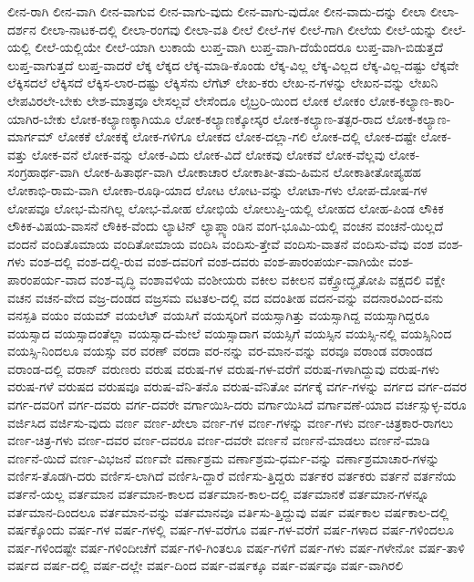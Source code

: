 {ಲೀನ-ರಾಗಿ
ಲೀನ-ವಾಗಿ
ಲೀನ-ವಾಗುವ
ಲೀನ-ವಾಗು-ವುದು
ಲೀನ-ವಾಗು-ವುದೋ
ಲೀನ-ವಾದು-ದನ್ನು
ಲೀಲಾ
ಲೀಲಾ-ದರ್ಶನ
ಲೀಲಾ-ನಾಟಕ-ದಲ್ಲಿ
ಲೀಲಾ-ರಂಗವು
ಲೀಲಾ-ವತಿ
ಲೀಲೆ
ಲೀಲೆ-ಗಳ
ಲೀಲೆ-ಗಾಗಿ
ಲೀಲೆಯ
ಲೀಲೆ-ಯನ್ನು
ಲೀಲೆ-ಯಲ್ಲಿ
ಲೀಲೆ-ಯಲ್ಲಿಯೇ
ಲೀಲೆ-ಯಾಗಿ
ಲುಕಾಯೆ
ಲುಪ್ತ-ವಾಗಿ
ಲುಪ್ತ-ವಾಗಿ-ದೆಯೆಂದರೂ
ಲುಪ್ತ-ವಾಗಿ-ಬಿಡುತ್ತದೆ
ಲುಪ್ತ-ವಾಗುತ್ತದೆ
ಲುಪ್ತ-ವಾದರೆ
ಲೆಕ್ಕ
ಲೆಕ್ಕದ
ಲೆಕ್ಕ-ಮಾಡಿ-ಕೊಂಡು
ಲೆಕ್ಕ-ವಿಲ್ಲ
ಲೆಕ್ಕ-ವಿಲ್ಲದ
ಲೆಕ್ಕ-ವಿಲ್ಲ-ದಷ್ಟು
ಲೆಕ್ಕವೇ
ಲೆಕ್ಕಿಸದಲೆ
ಲೆಕ್ಕಿಸದೆ
ಲೆಕ್ಕಿಸ-ಲಾರ-ದಷ್ಟು
ಲೆಕ್ಕಿಸೆನು
ಲೆಗೆಟ್
ಲೇಖ-ಕರು
ಲೇಖ-ನ-ಗಳನ್ನು
ಲೇಖನ-ವನ್ನು
ಲೇಖನಿ
ಲೇಪವಿರಲೇ-ಬೇಕು
ಲೇಶ-ಮಾತ್ರವೂ
ಲೇಸಲ್ಲವೆ
ಲೇಸೆಂದೂ
ಲೈಬ್ರರಿ-ಯಿಂದ
ಲೋಕ
ಲೋಕಂ
ಲೋಕ-ಕಲ್ಯಾಣ-ಕಾರಿ-ಯಾಗಿರ-ಬೇಕು
ಲೋಕ-ಕಲ್ಯಾಣಕ್ಕಾಗಿಯೂ
ಲೋಕ-ಕಲ್ಯಾಣಕ್ಕೋಸ್ಕರ
ಲೋಕ-ಕಲ್ಯಾಣ-ತತ್ಪರ-ರಾದ
ಲೋಕ-ಕಲ್ಯಾಣ-ಮಾರ್ಗಮ್
ಲೋಕಕೆ
ಲೋಕಕ್ಕೆ
ಲೋಕ-ಗಳಿಗೂ
ಲೋಕದ
ಲೋಕ-ದಲ್ಲಾ-ಗಲಿ
ಲೋಕ-ದಲ್ಲಿ
ಲೋಕ-ದಷ್ಟೇ
ಲೋಕ-ವತ್ತು
ಲೋಕ-ವನೆ
ಲೋಕ-ವನ್ನು
ಲೋಕ-ವಿದು
ಲೋಕ-ವಿದೆ
ಲೋಕವು
ಲೋಕವೆ
ಲೋಕ-ವೆಲ್ಲವು
ಲೋಕ-ಸಂಗ್ರಹಾರ್ಥ-ವಾಗಿ
ಲೋಕ-ಹಿತಾರ್ಥ-ವಾಗಿ
ಲೋಕಾಚಾರ
ಲೋಕಾತೀ-ತಮ-ಹಿಮನ
ಲೋಕಾತೀತೋಪ್ಯಹಹ
ಲೋಕಾಭಿ-ರಾಮ-ವಾಗಿ
ಲೋಕಾ-ರೂಢಿ-ಯಾದ
ಲೋಟ
ಲೋಟ-ವನ್ನು
ಲೋಟಾ-ಗಳು
ಲೋಪ-ದೋಷ-ಗಳ
ಲೋಪವೂ
ಲೋಭ-ಮೆನಗಿಲ್ಲ
ಲೋಭ-ಮೋಹ
ಲೋಭಿಯೆ
ಲೋಲುಪ್ತಿ-ಯಲ್ಲಿ
ಲೋಹದ
ಲೋಹ-ಪಿಂಡ
ಲೌಕಿಕ
ಲೌಕಿಕ-ವಿಷಯ-ವಾಸನೆ
ಲೌಕಿಕ-ವೆಂದು
ಲ್ಯಾಟಿನ್
ಲ್ಯಾಪ್ಲ್ಯಾಂಡಿನ
ವಂಗ-ಭೂಮಿ-ಯಲ್ಲಿ
ವಂಚನ
ವಂಚನೆ-ಯಿಲ್ಲದೆ
ವಂದನೆ
ವಂದಿತೊಮಾಯ
ವಂದಿತೋಮಾಯ
ವಂದಿಸಿ
ವಂದಿಸು-ತ್ತೇವೆ
ವಂದಿಸು-ವಾತನೆ
ವಂದಿಸು-ವೆವು
ವಂಶ
ವಂಶ-ಗಳು
ವಂಶ-ದಲ್ಲಿ
ವಂಶ-ದಲ್ಲಿ-ರುವ
ವಂಶ-ದವರಿಗೆ
ವಂಶ-ದವರು
ವಂಶ-ಪಾರಂಪರ್ಯ-ವಾಗಿಯೇ
ವಂಶ-ಪಾರಂಪರ್ಯ-ವಾದ
ವಂಶ-ವೃದ್ಧಿ
ವಂಶಾವಳಿಯ
ವಂಶೀಯರು
ವಕೀಲ
ವಕೀಲನ
ವಕ್ತ್ರೋದ್ಧೃತೋಪಿ
ವಕ್ಷದಲಿ
ವಕ್ಷೇ
ವಚನ
ವಚನ-ವೇದ
ವಜ್ರ-ದಂಡದ
ವಜ್ರಸಮ
ವಟತಲ-ದಲ್ಲಿ
ವದ
ವದಂತೀಹ
ವದನ-ವನ್ನು
ವದನಾರವಿಂದ-ವನು
ವನಸ್ಪತಿ
ವಯಂ
ವಯಮ್
ವಯಲೆಟ್
ವಯಸಿಗೆ
ವಯಸ್ಕರಿಗೆ
ವಯಸ್ಸಾಗಿತ್ತು
ವಯಸ್ಸಾಗಿದ್ದ
ವಯಸ್ಸಾಗಿದ್ದರೂ
ವಯಸ್ಸಾದ
ವಯಸ್ಸಾದಂತೆಲ್ಲಾ
ವಯಸ್ಸಾದ-ಮೇಲೆ
ವಯಸ್ಸಾದಾಗ
ವಯಸ್ಸಿಗೆ
ವಯಸ್ಸಿನ
ವಯಸ್ಸಿ-ನಲ್ಲಿ
ವಯಸ್ಸಿನಿಂದ
ವಯಸ್ಸಿ-ನಿಂದಲೂ
ವಯಸ್ಸು
ವರ
ವರಣ್
ವರದಾ
ವರ-ನನ್ನು
ವರ-ಮಾನ-ವನ್ನು
ವರವೂ
ವರಾಂಡ
ವರಾಂಡದ
ವರಾಂಡ-ದಲ್ಲಿ
ವರಾನ್
ವರುಣರು
ವರುಷ
ವರುಷ-ಗಳ
ವರುಷ-ಗಳ-ವರೆಗೆ
ವರುಷ-ಗಳಾಗಿದ್ದುವು
ವರುಷ-ಗಳು
ವರುಷ-ಗಳೆ
ವರುಷದ
ವರುಷವೂ
ವರುಷ-ವೆನಿ-ತನೊ
ವರುಷ-ವೆನಿತೋ
ವರ್ಗಕ್ಕೆ
ವರ್ಗ-ಗಳನ್ನು
ವರ್ಗದ
ವರ್ಗ-ದವರ
ವರ್ಗ-ದವರಿಗೆ
ವರ್ಗ-ದವರು
ವರ್ಗ-ದವರೇ
ವರ್ಗಾಯಿಸಿ-ದರು
ವರ್ಗಾಯಿಸಿದೆ
ವರ್ಗಾವಣೆ-ಯಾದ
ವರ್ಚಸ್ಸುಳ್ಳ-ವರೂ
ವರ್ಜಿಸಿದ
ವರ್ಜಿಸು-ವುದು
ವರ್ಣ
ವರ್ಣ-ಖೇಲಾ
ವರ್ಣ-ಗಳ
ವರ್ಣ-ಗಳನ್ನು
ವರ್ಣ-ಗಳು
ವರ್ಣ-ಚಿತ್ರಕಾರ-ರಾಗಲು
ವರ್ಣ-ಚಿತ್ರ-ಗಳು
ವರ್ಣ-ದವರ
ವರ್ಣ-ದವರೂ
ವರ್ಣ-ದವರೇ
ವರ್ಣನೆ
ವರ್ಣನೆ-ಮಾಡಲು
ವರ್ಣನೆ-ಮಾಡಿ
ವರ್ಣನೆ-ಯಿದೆ
ವರ್ಣ-ವಿಭಜನೆ
ವರ್ಣವೇ
ವರ್ಣಾಶ್ರಮ
ವರ್ಣಾಶ್ರಮ-ಧರ್ಮ-ವನ್ನು
ವರ್ಣಾಶ್ರಮಾಚಾರ-ಗಳನ್ನು
ವರ್ಣಿಸ-ತೊಡಗಿ-ದರು
ವರ್ಣಿಸ-ಲಾಗಿದೆ
ವರ್ಣಿಸಿ-ದ್ದಾರೆ
ವರ್ಣಿಸು-ತ್ತಿದ್ದರು
ವರ್ತಕರ
ವರ್ತಕರು
ವರ್ತನೆ
ವರ್ತನೆಯ
ವರ್ತನೆ-ಯಲ್ಲ
ವರ್ತಮಾನ
ವರ್ತಮಾನ-ಕಾಲದ
ವರ್ತಮಾನ-ಕಾಲ-ದಲ್ಲಿ
ವರ್ತಮಾನಕೆ
ವರ್ತಮಾನ-ಗಳನ್ನೂ
ವರ್ತಮಾನ-ದಿಂದಲೂ
ವರ್ತಮಾನ-ವನ್ನು
ವರ್ತಮಾನವೂ
ವರ್ತಿಸು-ತ್ತಿದ್ದುವು
ವರ್ಷ
ವರ್ಷಕಾಲ
ವರ್ಷಕಾಲ-ದಲ್ಲಿ
ವರ್ಷಕ್ಕೊಂದು
ವರ್ಷ-ಗಳ
ವರ್ಷ-ಗಳಲ್ಲಿ
ವರ್ಷ-ಗಳ-ವರೆಗೂ
ವರ್ಷ-ಗಳ-ವರೆಗೆ
ವರ್ಷ-ಗಳಾದ
ವರ್ಷ-ಗಳಿಂದಲೂ
ವರ್ಷ-ಗಳಿಂದಷ್ಟೇ
ವರ್ಷ-ಗಳಿಂದೀಚೆಗೆ
ವರ್ಷ-ಗಳಿ-ಗಿಂತಲೂ
ವರ್ಷ-ಗಳಿಗೆ
ವರ್ಷ-ಗಳು
ವರ್ಷ-ಗಳೇನೋ
ವರ್ಷ-ತಾಳಿ
ವರ್ಷದ
ವರ್ಷ-ದಲ್ಲಿ
ವರ್ಷ-ದಲ್ಲೇ
ವರ್ಷ-ದಿಂದ
ವರ್ಷ-ವರ್ಷಕ್ಕೂ
ವರ್ಷ-ವರ್ಷವೂ
ವರ್ಷ-ವಾಗಿರಲಿ
}
